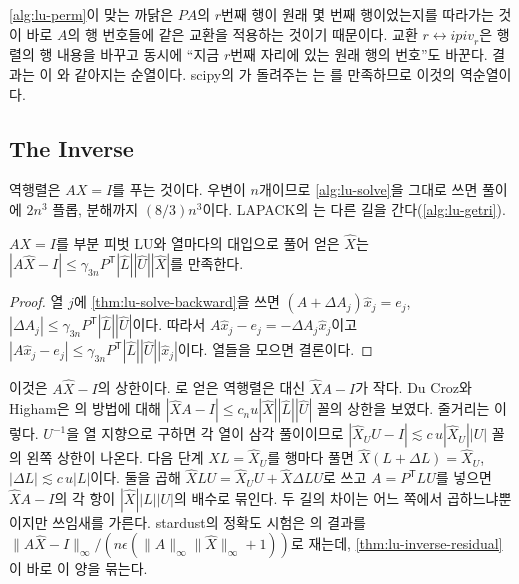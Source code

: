\cref{alg:lu-perm}이 맞는 까닭은 $PA$의 $r$번째 행이 원래 몇 번째 행이었는지를 따라가는 것이 바로 $A$의 행 번호들에 같은 교환을 적용하는 것이기 때문이다. 교환 $r\leftrightarrow\mathit{ipiv}_r$은 행렬의 행 내용을 바꾸고 동시에 ``지금 $r$번째 자리에 있는 원래 행의 번호''도 바꾼다. 결과는 이 와 같아지는 순열이다. scipy의 가 돌려주는 는 를 만족하므로 이것의 역순열이다.

\subsection{The Inverse}

역행렬은 $AX=I$를 푸는 것이다. 우변이 $n$개이므로 \cref{alg:lu-solve}을 그대로 쓰면 풀이에 $2n^3$ 플롭, 분해까지 $(8/3)n^3$이다. LAPACK의 는 다른 길을 간다(\cref{alg:lu-getri}). 

\begin{theorem}
\label{thm:lu-inverse-residual}
$AX=I$를 부분 피벗 LU와 열마다의 대입으로 풀어 얻은 $\hat X$는 $|A\hat X-I|\le\gamma_{3n}P^{\mathsf T}|\hat L||\hat U||\hat X|$를 만족한다.
\end{theorem}

\begin{proof}
열 $j$에 \cref{thm:lu-solve-backward}을 쓰면 $(A+\Delta A_j)\hat x_j=e_j$, $|\Delta A_j|\le\gamma_{3n}P^{\mathsf T}|\hat L||\hat U|$이다. 따라서 $A\hat x_j-e_j=-\Delta A_j\hat x_j$이고 $|A\hat x_j-e_j|\le\gamma_{3n}P^{\mathsf T}|\hat L||\hat U||\hat x_j|$이다. 열들을 모으면 결론이다.
\end{proof}

이것은  $A\hat X-I$의 상한이다. 로 얻은 역행렬은 대신  $\hat XA-I$가 작다. Du Croz와 Higham은 의 방법에 대해 $|\hat XA-I|\le c_nu|\hat X||\hat L||\hat U|$ 꼴의 상한을 보였다\cite{ducroz1992inversion}. 줄거리는 이렇다. $U^{-1}$을 열 지향으로 구하면 각 열이 삼각 풀이이므로 $|\hat X_UU-I|\lesssim c\,u|\hat X_U||U|$ 꼴의 왼쪽 상한이 나온다. 다음 단계 $XL=\hat X_U$를 행마다 풀면 $\hat X(L+\Delta L)=\hat X_U$, $|\Delta L|\lesssim c\,u|L|$이다. 둘을 곱해 $\hat XLU=\hat X_UU+\hat X\Delta LU$로 쓰고 $A=P^{\mathsf T}LU$를 넣으면 $\hat XA-I$의 각 항이 $|\hat X||L||U|$의 배수로 묶인다. 두 길의 차이는 어느 쪽에서 곱하느냐뿐이지만 쓰임새를 가른다. stardust의 정확도 시험은 의 결과를 $\|A\hat X-I\|_\infty/(n\epsilon(\|A\|_\infty\|\hat X\|_\infty+1))$로 재는데, \cref{thm:lu-inverse-residual}이 바로 이 양을 묶는다.


